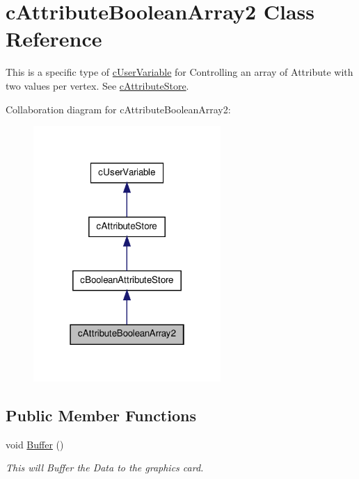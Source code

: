 \hypertarget{classc_attribute_boolean_array2}{
\section{cAttributeBooleanArray2 Class Reference}
\label{classc_attribute_boolean_array2}
}


This is a specific type of \hyperlink{classc_user_variable}{cUserVariable} for Controlling an array of Attribute with two values per vertex. See \hyperlink{classc_attribute_store}{cAttributeStore}.  




Collaboration diagram for cAttributeBooleanArray2:\nopagebreak
\begin{figure}[H]
\begin{center}
\leavevmode
\includegraphics[width=202pt]{classc_attribute_boolean_array2__coll__graph}
\end{center}
\end{figure}
\subsection*{Public Member Functions}
\begin{DoxyCompactItemize}
\item 
\hypertarget{classc_attribute_boolean_array2_a6c979a10c0d436f862211a42908a8acc}{
void \hyperlink{classc_attribute_boolean_array2_a6c979a10c0d436f862211a42908a8acc}{Buffer} ()}
\label{classc_attribute_boolean_array2_a6c979a10c0d436f862211a42908a8acc}

\begin{DoxyCompactList}\small\item\em This will Buffer the Data to the graphics card. \end{DoxyCompactList}\end{DoxyCompactItemize}


